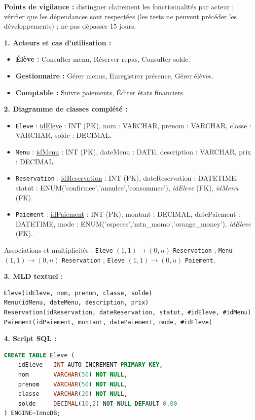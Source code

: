 \documentclass[11pt]{article}
\begin{document}
\begin{corrige}
\textbf{Points de vigilance :} distinguer clairement les fonctionnalités par acteur ; vérifier que les dépendances sont respectées (les tests ne peuvent précéder les développements) ; ne pas dépasser 15 jours.
\end{corrige}

\begin{corrige}
\textbf{1. Acteurs et cas d'utilisation :}
\begin{itemize}
    \item \textbf{Élève :} Consulter menu, Réserver repas, Consulter solde.
    \item \textbf{Gestionnaire :} Gérer menus, Enregistrer présence, Gérer élèves.
    \item \textbf{Comptable :} Suivre paiements, Éditer états financiers.
\end{itemize}

\textbf{2. Diagramme de classes complété :}
\begin{itemize}
    \item \texttt{Eleve} : \underline{idEleve} : INT (PK), nom : VARCHAR, prenom : VARCHAR, classe : VARCHAR, solde : DECIMAL.
    \item \texttt{Menu} : \underline{idMenu} : INT (PK), dateMenu : DATE, description : VARCHAR, prix : DECIMAL.
    \item \texttt{Reservation} : \underline{idReservation} : INT (PK), dateReservation : DATETIME, statut : ENUM('confirmee','annulee','consommee'), \emph{idEleve} (FK), \emph{idMenu} (FK).
    \item \texttt{Paiement} : \underline{idPaiement} : INT (PK), montant : DECIMAL, datePaiement : DATETIME, mode : ENUM('especes','mtn\_momo','orange\_money'), \emph{idEleve} (FK).
\end{itemize}
Associations et multiplicités : \texttt{Eleve} $(1,1) \to (0,n)$ \texttt{Reservation} ; \texttt{Menu} $(1,1) \to (0,n)$ \texttt{Reservation} ; \texttt{Eleve} $(1,1) \to (0,n)$ \texttt{Paiement}.

\textbf{3. MLD textuel :}
\begin{lstlisting}
Eleve(idEleve, nom, prenom, classe, solde)
Menu(idMenu, dateMenu, description, prix)
Reservation(idReservation, dateReservation, statut, #idEleve, #idMenu)
Paiement(idPaiement, montant, datePaiement, mode, #idEleve)
\end{lstlisting}

\textbf{4. Script SQL :}
\begin{lstlisting}[language=SQL]
CREATE TABLE Eleve (
    idEleve   INT AUTO_INCREMENT PRIMARY KEY,
    nom       VARCHAR(50) NOT NULL,
    prenom    VARCHAR(50) NOT NULL,
    classe    VARCHAR(20) NOT NULL,
    solde     DECIMAL(10,2) NOT NULL DEFAULT 0.00
) ENGINE=InnoDB;


\end{lstlisting}
\end{corrige}
\end{document}
